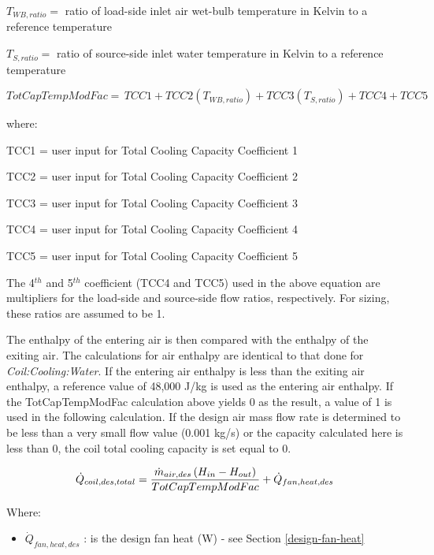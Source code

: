 $T_{WB,ratio} = $ ratio of load-side inlet air wet-bulb temperature in Kelvin to a reference temperature

$T_{S,ratio} = $ ratio of source-side inlet water temperature in Kelvin to a reference temperature

\begin{equation}
TotCapTempModFac = \,TCC1 + TCC2\left( {{T_{WB,ratio}}} \right) + TCC3\left( {{T_{S,ratio}}} \right) + TCC4 + TCC5
\end{equation}

where:

TCC1 = user input for Total Cooling Capacity Coefficient 1

TCC2 = user input for Total Cooling Capacity Coefficient 2

TCC3 = user input for Total Cooling Capacity Coefficient 3

TCC4 = user input for Total Cooling Capacity Coefficient 4

TCC5 = user input for Total Cooling Capacity Coefficient 5


The 4\(^{th}\) and 5\(^{th}\) coefficient (TCC4 and TCC5) used in the above equation are multipliers for the load-side and source-side flow ratios, respectively. For sizing, these ratios are assumed to be 1.

The enthalpy of the entering air is then compared with the enthalpy of the exiting air. The calculations for air enthalpy are identical to that done for \emph{Coil:Cooling:Water}. If the entering air enthalpy is less than the exiting air enthalpy, a reference value of 48,000 J/kg is used as the entering air enthalpy. If the TotCapTempModFac calculation above yields 0 as the result, a value of 1 is used in the following calculation. If the design air mass flow rate is determined to be less than a very small flow value (0.001 kg/s) or the capacity calculated here is less than 0, the coil total cooling capacity is set equal to 0.

\begin{equation}
  \dot{Q}_{coil,des,total}   = \frac{\dot{m}_{air,des}\PB{H_{in}-H_{out}}}{TotCapTempModFac} + \dot{Q}_{fan,heat,des}
\end{equation}

Where:

\begin{itemize}
\item
  \(\dot{Q}_{fan,heat,des}\) : is the design fan heat (W) - see Section \ref{design-fan-heat}
\end{itemize}

